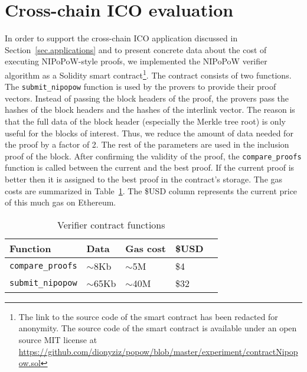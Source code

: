 \section{Cross-chain ICO evaluation}
\label{sec.app-ico}

In order to support the cross-chain ICO application discussed in
Section~\ref{sec.applications} and to present concrete data about the cost of
executing NIPoPoW-style proofs, we implemented the NIPoPoW verifier algorithm as
a Solidity smart contract\footnote{
\ifanonymous
The link to the source code of the smart contract has been redacted for anonymity.
\else
The source code of the smart contract is available under an open source MIT
license at
\url{https://github.com/dionyziz/popow/blob/master/experiment/contractNipopow.sol}
\fi
}.
The contract consists of two functions.
The \texttt{submit\_nipopow} function is used by the provers to provide their
proof vectors. Instead of passing the block headers of the proof, the provers
pass the hashes of the block headers and the hashes of the interlink vector. The
reason is that the full data of the block header (especially the Merkle tree
root) is only useful for the blocks of interest. Thus, we reduce the amount of
data needed for the proof by a factor of 2. The rest of the parameters are used
in the inclusion proof of the block. After confirming the validity of the proof,
the \texttt{compare\_proofs} function is called between the current and the best
proof. If the current proof is better then it is assigned to the best proof in
the contract's storage.
The gas costs are summarized in
Table~\ref{tbl:gascosts}. The \$USD column represents the current price of this
much gas on Ethereum.

\begin{table}[ht]
  \centering
  \caption{Verifier contract functions}
  \label{tbl:gascosts}
  \begin{tabular}{l|l|l|ll}
    \hline
    Function & Data & Gas cost & \$USD \\ \hline
    \texttt{compare\_proofs} & $\sim$8Kb & $\sim$5M & \$4 \\ \hline
    \texttt{submit\_nipopow} & $\sim$65Kb & $\sim$40M & \$32 \\ \hline
  \end{tabular}
\end{table}
